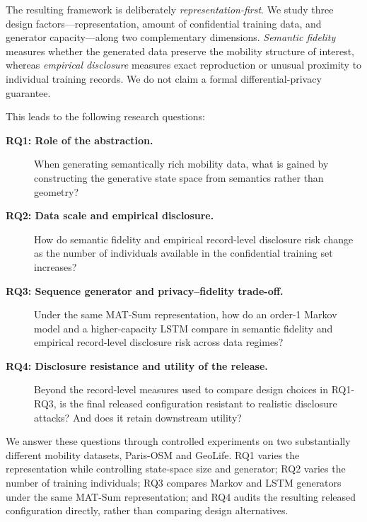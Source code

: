 \documentclass[sigconf,nonacm]{acmart}
\begin{document}
The resulting framework is deliberately \emph{representation-first}.
We study three design factors---representation, amount of confidential
training data, and generator capacity---along two complementary
dimensions. \emph{Semantic fidelity} measures whether the generated data
preserve the mobility structure of interest, whereas
\emph{empirical disclosure} measures exact reproduction or unusual
proximity to individual training records. We do not claim a formal
differential-privacy guarantee.

This leads to the following research questions:

\begin{description}

\item[\textbf{RQ1: Role of the abstraction.}]
When generating semantically rich mobility data, what is gained by
constructing the generative state space from semantics rather than
geometry?

\item[\textbf{RQ2: Data scale and empirical disclosure.}]
How do semantic fidelity and empirical record-level disclosure risk
change as the number of individuals available in the confidential
training set increases?

\item[\textbf{RQ3: Sequence generator and privacy--fidelity trade-off.}]
Under the same MAT-Sum representation, how do an order-1 Markov model
and a higher-capacity LSTM compare in semantic fidelity and empirical
record-level disclosure risk across data regimes?

\item[\textbf{RQ4: Disclosure resistance and utility of the release.}]
Beyond the record-level measures used to compare design choices in RQ1-RQ3, is the final released configuration resistant to realistic disclosure attacks? %
And does it retain downstream utility?

\end{description}

We answer these questions through controlled experiments on two
substantially different mobility datasets, Paris-OSM and GeoLife.
RQ1 varies the representation while controlling state-space size and generator; RQ2 varies the number of training individuals; RQ3 compares Markov and LSTM generators under the same MAT-Sum representation; and RQ4 audits the resulting released configuration directly, rather than comparing design alternatives.
\end{document}
